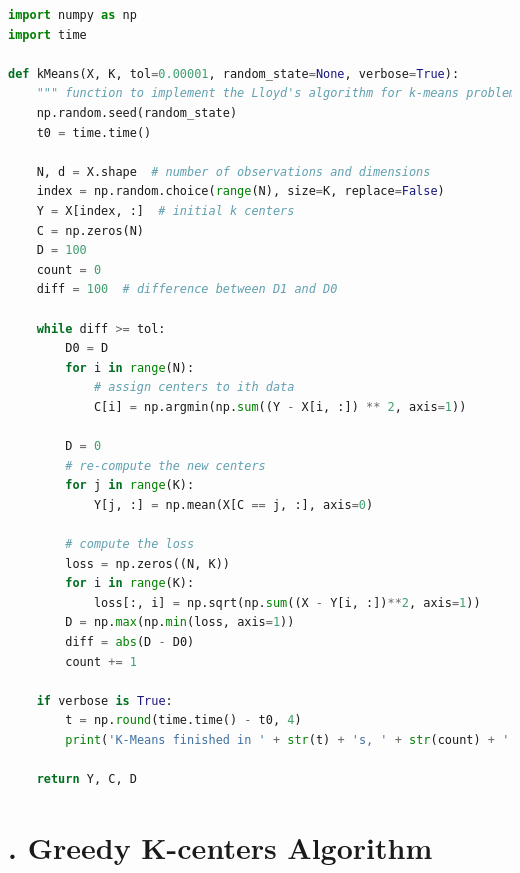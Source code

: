 \begin{description}
\begin{lstlisting}[language=Python, caption=K-Means Algorithm Python Code]
import numpy as np
import time

def kMeans(X, K, tol=0.00001, random_state=None, verbose=True):
    """ function to implement the Lloyd's algorithm for k-means problem """
    np.random.seed(random_state)
    t0 = time.time()

    N, d = X.shape  # number of observations and dimensions
    index = np.random.choice(range(N), size=K, replace=False)
    Y = X[index, :]  # initial k centers
    C = np.zeros(N)
    D = 100
    count = 0
    diff = 100  # difference between D1 and D0

    while diff >= tol:
        D0 = D
        for i in range(N):
            # assign centers to ith data
            C[i] = np.argmin(np.sum((Y - X[i, :]) ** 2, axis=1))

        D = 0
        # re-compute the new centers
        for j in range(K):
            Y[j, :] = np.mean(X[C == j, :], axis=0)

        # compute the loss
        loss = np.zeros((N, K))
        for i in range(K):
            loss[:, i] = np.sqrt(np.sum((X - Y[i, :])**2, axis=1))
        D = np.max(np.min(loss, axis=1))
        diff = abs(D - D0)
        count += 1

    if verbose is True:
        t = np.round(time.time() - t0, 4)
        print('K-Means finished in ' + str(t) + 's, ' + str(count) + ' iters')

    return Y, C, D
\end{lstlisting}

\end{description}

\section*{\Large {}. Greedy K-centers Algorithm}

